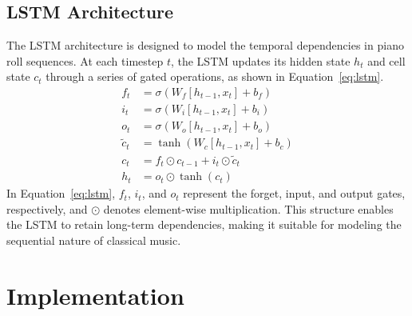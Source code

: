 \documentclass[conference]{IEEEtran}
\begin{document}
\subsection{LSTM Architecture}
The LSTM architecture is designed to model the temporal dependencies in piano roll sequences. At each timestep $t$, the LSTM updates its hidden state $h_t$ and cell state $c_t$ through a series of gated operations, as shown in Equation~\ref{eq:lstm}. 
\begin{equation}
\label{eq:lstm}
\begin{aligned}
f_t &= \sigma(W_f [h_{t-1}, x_t] + b_f) \\
i_t &= \sigma(W_i [h_{t-1}, x_t] + b_i) \\
o_t &= \sigma(W_o [h_{t-1}, x_t] + b_o) \\
\tilde{c}_t &= \tanh(W_c [h_{t-1}, x_t] + b_c) \\
c_t &= f_t \odot c_{t-1} + i_t \odot \tilde{c}_t \\
h_t &= o_t \odot \tanh(c_t)
\end{aligned}
\end{equation}
In Equation~\ref{eq:lstm}, $f_t$, $i_t$, and $o_t$ represent the forget, input, and output gates, respectively, and $\odot$ denotes element-wise multiplication. This structure enables the LSTM to retain long-term dependencies, making it suitable for modeling the sequential nature of classical music.

\section{Implementation}
\label{sec:implementation}

\end{document}
